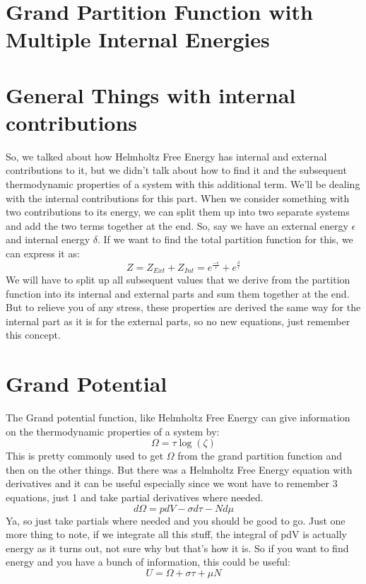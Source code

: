 \documentclass[arial]{article}
\begin{document}
\section*{Grand Partition Function with Multiple Internal Energies}

\section*{General Things with internal contributions}
So, we talked about how Helmholtz Free Energy has internal and external contributions to it, but we didn't talk about how to find it and the subsequent thermodynamic properties of a system with this additional term. We'll be dealing with the internal contributions for this part. When we consider something with two contributions to its energy, we can split them up into two separate systems and add the two terms together at the end. So, say we have an external energy $\epsilon$ and internal energy $\delta$. If we want to find the total partition function for this, we can express it as:
\begin{equation}
Z=Z_{Ext}+Z_{Int} = e^\frac{-\epsilon}{\tau}+e^\frac{\delta}{\tau}
\end{equation}
We will have to split up all subsequent values that we derive from the partition function into its internal and external parts and sum them together at the end. But to relieve you of any stress, these properties are derived the same way for the internal part as it is for the external parts, so no new equations, just remember this concept.

\section*{Grand Potential}
The Grand potential function, like Helmholtz Free Energy can give information on the thermodynamic properties of a system by:
\begin{equation}
\Omega=\tau \log (\zeta)
\end{equation}
This is pretty commonly used to get $\Omega$ from the grand partition function and then on the other things. But there was a Helmholtz Free Energy equation with derivatives and it can be useful especially since we wont have to remember 3 equations, just 1 and take partial derivatives where needed.
\begin{equation}
d\Omega = pdV - \sigma d\tau -Nd\mu
\end{equation}
Ya, so just take partials where needed and you should be good to go. Just one more thing to note, if we integrate all this stuff, the integral of pdV is actually energy as it turns out, not sure why but that's how it is. So if you want to find energy and you have a bunch of information, this could be useful:
\begin{equation}
U=\Omega +\sigma \tau + \mu N
\end{equation}
\end{document}
